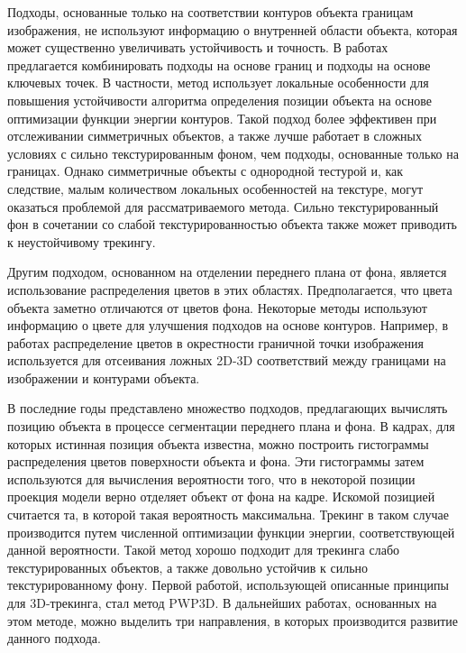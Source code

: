 Подходы, основанные только на соответствии контуров объекта границам
изображения, не используют информацию о внутренней области объекта, которая
может существенно увеличивать устойчивость и точность.
В работах \cite{VacchettiEdges2004,ChoiFeaturesAndEdges,Bugaev_2018_ECCV}
предлагается комбинировать подходы на основе границ и подходы на основе
ключевых точек.
В частности, метод \cite{Bugaev_2018_ECCV} использует локальные особенности для
повышения устойчивости алгоритма определения позиции объекта на основе
оптимизации функции энергии контуров.
Такой подход более эффективен при отслеживании симметричных объектов, а также
лучше работает в сложных условиях с сильно текстурированным фоном, чем подходы,
основанные только на границах.
Однако симметричные объекты с однородной тестурой и, как следствие, малым
количеством локальных особенностей на текстуре, могут оказаться проблемой для
рассматриваемого метода.
Сильно текстурированный фон в сочетании со слабой текстурированностью
объекта также может приводить к неустойчивому трекингу.

Другим подходом, основанном на отделении переднего плана от фона, является
использование распределения цветов в этих областях.
Предполагается, что цвета объекта заметно отличаются от цветов фона.
Некоторые методы \cite{SeoHinterstoisser2014,WangZhong2015,Zhong2018}
используют информацию о цвете для улучшения подходов на основе контуров.
Например, в работах \cite{SeoHinterstoisser2014,WangZhong2015} распределение
цветов в окрестности граничной точки изображения используется для отсеивания
ложных 2D-3D соответствий между границами на изображении и контурами объекта.

В последние годы представлено множество подходов, предлагающих вычислять
позицию объекта в процессе сегментации переднего плана и фона.
В кадрах, для которых истинная позиция объекта известна, можно построить
гистограммы распределения цветов поверхности объекта и фона.
Эти гистограммы затем используются для вычисления вероятности того, что в
некоторой позиции проекция модели верно отделяет объект от фона на кадре.
Искомой позицией считается та, в которой такая вероятность максимальна.
Трекинг в таком случае производится путем численной оптимизации функции
энергии, соответствующей данной вероятности.
Такой метод хорошо подходит для трекинга слабо текстурированных объектов, а
также довольно устойчив к сильно текстурированному фону.
Первой работой, использующей описанные принципы для 3D-трекинга, стал метод
PWP3D\cite{PWP3D}.
В дальнейших работах, основанных на этом методе, можно выделить три
направления, в которых производится развитие данного подхода.


